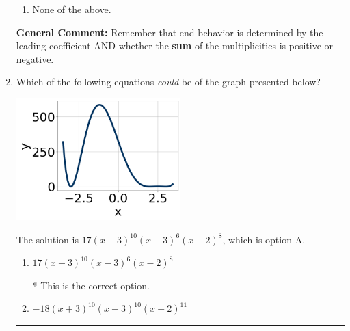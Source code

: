 \documentclass{extbook}[14pt]
\newcommand{\litem}[1]{\item #1

\rule{\textwidth}{0.4pt}}
\begin{document}
\begin{enumerate}
{\begin{enumerate}[label=\Alph*.]
\item None of the above.\end{enumerate}
\textbf{General Comment:} Remember that end behavior is determined by the leading coefficient AND whether the \textbf{sum} of the multiplicities is positive or negative.
}
\litem{
Which of the following equations \textit{could} be of the graph presented below?

\begin{center}
    \includegraphics[width=0.5\textwidth]{../Figures/polyGraphToFunctionCopyC.png}
\end{center}


The solution is \( 17(x + 3)^{10} (x - 3)^{6} (x - 2)^{8} \), which is option A.\begin{enumerate}[label=\Alph*.]
\item \( 17(x + 3)^{10} (x - 3)^{6} (x - 2)^{8} \)

* This is the correct option.
\item \( -18(x + 3)^{10} (x - 3)^{10} (x - 2)^{11} \)


\end{enumerate}}
\end{enumerate}
\end{document}

